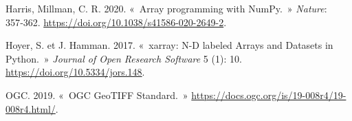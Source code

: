 \documentclass[
]{article}
\newlength{\cslhangindent}
\newenvironment{CSLReferences}[2] %
 {\begin{list}{}{%
  \setlength{\itemindent}{0pt}
  \setlength{\leftmargin}{0pt}
  \setlength{\parsep}{0pt}
  \ifodd #1
   \setlength{\leftmargin}{\cslhangindent}
   \setlength{\itemindent}{-1\cslhangindent}
  \fi
  \setlength{\itemsep}{#2\baselineskip}}}
 {\end{list}}
\begin{document}
\label{refs}
\begin{CSLReferences}{1}{0}
Harris, Millman, C. R. 2020. {«~Array programming with NumPy.~»}
\emph{{Nature}}: 357‑362.
\url{https://doi.org/10.1038/s41586-020-2649-2}.

Hoyer, S. et J. Hamman. 2017. {«~xarray: N-D labeled Arrays and Datasets
in Python.~»} \emph{{Journal of Open Research Software}} 5 (1): 10.
\url{https://doi.org/10.5334/jors.148}.

OGC. 2019. {«~{OGC GeoTIFF Standard}.~»}
\url{https://docs.ogc.org/is/19-008r4/19-008r4.html/}.

\end{CSLReferences}
\end{document}
